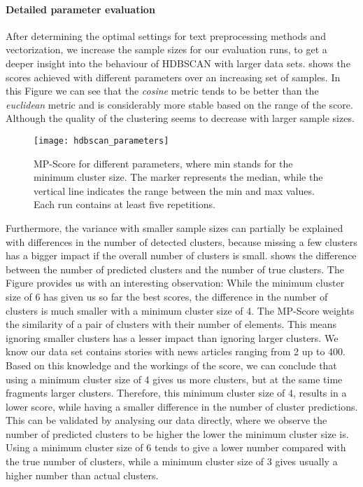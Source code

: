 \paragraph{Detailed parameter evaluation}
After determining the optimal settings for text preprocessing methods and vectorization,
we increase the sample sizes for our evaluation runs,
to get a deeper insight into the behaviour of HDBSCAN with larger data sets.
 shows the scores achieved with different parameters
over an increasing set of samples.
In this Figure we can see that the \textit{cosine} metric tends to be better than the \textit{euclidean} metric
and is considerably more stable based on the range of the score.
Although the quality of the clustering seems to decrease with larger sample sizes.

\begin{figure}[h]
    \centering
    \texttt{[image: hdbscan\_parameters]}
    \caption{
        MP-Score for different parameters, where min stands for the minimum cluster size.
        The marker represents the median, while the vertical line indicates the range between the min and max values.
        Each run contains at least five repetitions.
    }
    \label{fig:hdbscan_parameters}
\end{figure}

Furthermore, the variance with smaller sample sizes can partially be explained
with differences in the number of detected clusters,
because missing a few clusters has a bigger impact if the overall number of clusters is small.
 shows the difference between the number of predicted clusters
and the number of true clusters.
The Figure provides us with an interesting observation:
While the minimum cluster size of 6 has given us so far the best scores,
the difference in the number of clusters is much smaller with a minimum cluster size of 4.
The MP-Score weights the similarity of a pair of clusters with their number of elements.
This means ignoring smaller clusters has a lesser impact than ignoring larger clusters.
We know our data set contains stories with news articles ranging from 2 up to 400.
Based on this knowledge and the workings of the score,
we can conclude that using a minimum cluster size of 4 gives us more clusters,
but at the same time fragments larger clusters.
Therefore, this minimum cluster size of 4, results in a lower score,
while having a smaller difference in the number of cluster predictions.
This can be validated by analysing our data directly,
where we observe the number of predicted clusters to be higher the lower the minimum cluster size is.
Using a minimum cluster size of 6 tends to give a lower number compared with the true number of clusters,
while a minimum cluster size of 3 gives usually a higher number than actual clusters.

